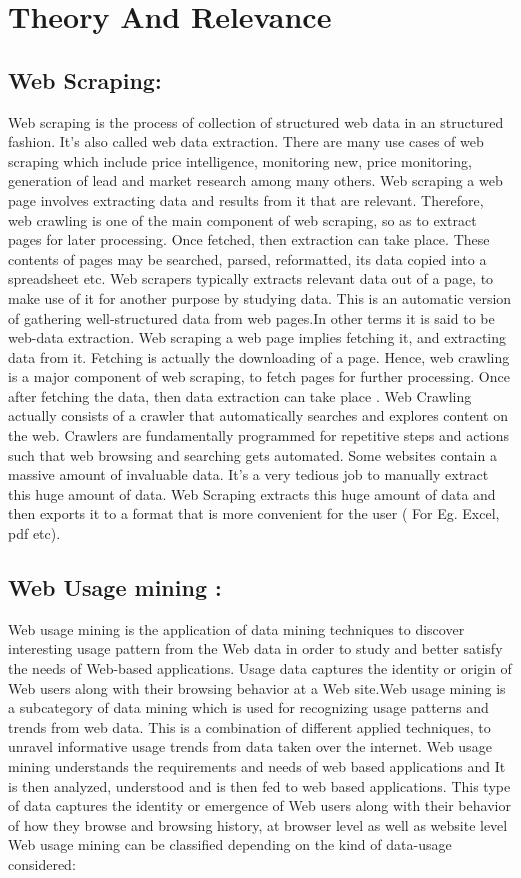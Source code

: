 \newpage
\chapter{Theory And Relevance}

\section{Web Scraping:}
Web scraping is the process of collection of structured web data in an structured fashion. It's also called web data extraction. There are many use cases of web scraping which include  price intelligence, monitoring new, price monitoring, generation of lead and market research among many others.
	Web scraping a web page involves extracting data and results from it that are relevant. Therefore, web crawling is one of the main component of web scraping, so as to extract pages for later processing. Once fetched, then extraction can take place. These contents of pages may be searched, parsed, reformatted, its data copied into a spreadsheet etc. Web scrapers typically extracts relevant data out of a page, to make use of it for another purpose by studying data. 
This is an automatic version of gathering well-structured data
from web pages.In other terms it is said to be web-data extraction. Web
scraping a web page implies fetching it, and extracting data
from it. Fetching is actually the downloading of a page.
Hence, web crawling is a major component of web scraping,
to fetch pages for further processing. Once after fetching the data, then
data extraction can take place . Web Crawling actually consists
of a crawler that automatically searches and explores content
on the web. Crawlers are fundamentally programmed for
repetitive steps and actions such that web browsing and
searching gets automated. Some websites contain a massive
amount of invaluable data. It’s a very tedious job to manually
extract this huge amount of data. Web Scraping extracts this
huge amount of data and then exports it to a format that is
more convenient for the user ( For Eg. Excel, pdf etc).
\section{Web Usage mining :}
Web usage mining is the application of data mining techniques to discover interesting usage pattern from the Web data in order to study and better satisfy the needs of Web-based applications. Usage data captures the identity or origin of Web users along with their browsing behavior at a Web site.Web usage mining is a subcategory of data mining which is
used for recognizing usage patterns and trends from web data.
This is a combination of different applied techniques, to
unravel informative usage trends from data taken over the
internet. Web usage mining understands the requirements and
needs of web based applications and It is then analyzed,
understood and is then fed to web based applications. This
type of data captures the identity or emergence of Web users
along with their behavior of how they browse and browsing
history, at browser level as well as website level\\
Web usage mining can be classified depending on the kind of data-usage considered:\\

